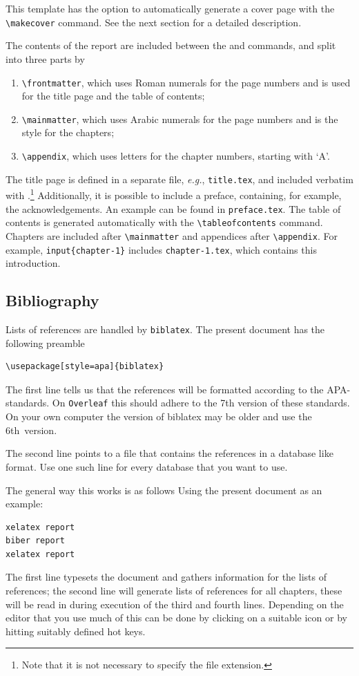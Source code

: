 This template has the option to automatically generate a cover page with the \verb|\makecover| command. See the next section for a detailed description.

The contents of the report are included between the \verb|| and \verb|| commands, and split into three parts by
\begin{enumerate}
    \item\verb|\frontmatter|, which uses Roman numerals for the page numbers and is used for the title page and the table of contents;
    \item\verb|\mainmatter|, which uses Arabic numerals for the page numbers and is the style for the chapters;
    \item\verb|\appendix|, which uses letters for the chapter numbers, starting with `A'.
\end{enumerate}
The title page is defined in a separate file, \emph{e.g.}, \texttt{title.tex}, and included verbatim with \verb||.\footnote{Note that it is not necessary to specify the file extension.} Additionally, it is possible to include a preface, containing, for example, the acknowledgements. An example can be found in \texttt{preface.tex}. The table of contents is generated automatically with the \verb|\tableofcontents| command. Chapters are included after \verb|\mainmatter| and appendices after \verb|\appendix|. For example, \verb|input{chapter-1}| includes \texttt{chapter-1.tex}, which contains this introduction.

\subsection{Bibliography}

Lists of references are handled by \texttt{biblatex}.
The present document has the following preamble
\begin{verbatim}
\usepackage[style=apa]{biblatex}

\end{verbatim}
The first line tells us that the references will be formatted according
to the APA-standards.
On \texttt{Overleaf} this should adhere to the 7th version of these
standards.
On your own computer the version of biblatex may be older and
use the 6th~version.

The second line points to a file that contains the references in a database
like format.
Use one such line for every database that you want to use.

The general way this works is as follows Using the present document as
an example:
\begin{verbatim}
xelatex report
biber report
xelatex report
\end{verbatim}
The first line typesets the document and gathers information for the lists
of references; the second line will generate lists of references for all
chapters, these will be read in during execution of the third and fourth lines.
Depending on the editor that you use much of this can be done by clicking
on a suitable icon or by hitting suitably defined hot keys.

